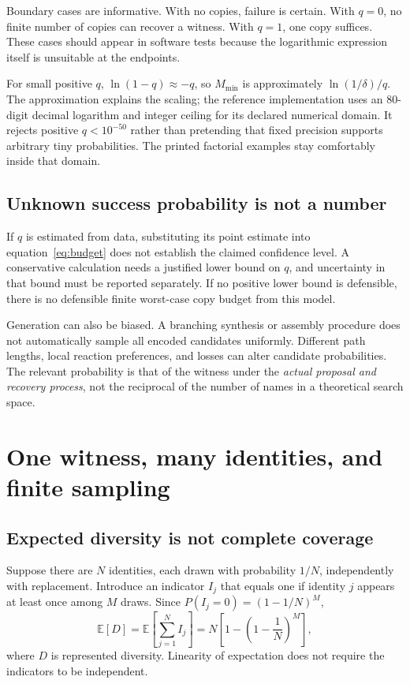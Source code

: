 Boundary cases are informative. With no copies, failure is certain. With $q=0$, no finite number of copies can recover a witness. With $q=1$, one copy suffices. These cases should appear in software tests because the logarithmic expression itself is unsuitable at the endpoints.

For small positive $q$, $\ln(1-q)\approx-q$, so $M_{\min}$ is approximately $\ln(1/\delta)/q$. The approximation explains the scaling; the reference implementation uses an 80-digit decimal logarithm and integer ceiling for its declared numerical domain. It rejects positive $q<10^{-50}$ rather than pretending that fixed precision supports arbitrary tiny probabilities. The printed factorial examples stay comfortably inside that domain.

\subsection{Unknown success probability is not a number}

If $q$ is estimated from data, substituting its point estimate into equation~\ref{eq:budget} does not establish the claimed confidence level. A conservative calculation needs a justified lower bound on $q$, and uncertainty in that bound must be reported separately. If no positive lower bound is defensible, there is no defensible finite worst-case copy budget from this model.

Generation can also be biased. A branching synthesis or assembly procedure does not automatically sample all encoded candidates uniformly. Different path lengths, local reaction preferences, and losses can alter candidate probabilities. The relevant probability is that of the witness under the \emph{actual proposal and recovery process}, not the reciprocal of the number of names in a theoretical search space.

\section{One witness, many identities, and finite sampling}

\subsection{Expected diversity is not complete coverage}

Suppose there are $N$ identities, each drawn with probability $1/N$, independently with replacement. Introduce an indicator $I_j$ that equals one if identity $j$ appears at least once among $M$ draws. Since $P(I_j=0)=(1-1/N)^M$,
\begin{equation}
\mathbb E[D]=\mathbb E\!\left[\sum_{j=1}^{N}I_j\right]
=N\left[1-\left(1-\frac1N\right)^M\right], \label{eq:diversity}
\end{equation}
where $D$ is represented diversity. Linearity of expectation does not require the indicators to be independent.

